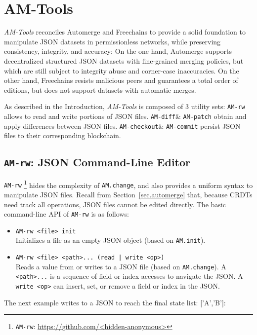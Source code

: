 \documentclass[12pt]{article}
\newcommand{\AMT}      {\emph{AM-Tools}\xspace}
\newcommand{\code}[1]  {\texttt{\footnotesize{#1}}}
\newcommand{\amrw}       {\code{AM-rw}\xspace}
\newcommand{\amdiff}     {\code{AM-diff}\xspace}
\newcommand{\ampatch}    {\code{AM-patch}\xspace}
\newcommand{\amcheckout} {\code{AM-checkout}\xspace}
\newcommand{\amcommit}   {\code{AM-commit}\xspace}
\begin{document}
\section{AM-Tools}
\label{sec.amtools}

\AMT reconciles Automerge and Freechains to provide a solid foundation to
manipulate JSON datasets in permissionless networks, while preserving
consistency, integrity, and accuracy:
%
On the one hand, Automerge supports decentralized structured JSON datasets with
fine-grained merging policies, but which are still subject to integrity abuse
and corner-case inaccuracies.
%
On the other hand, Freechains resists malicious peers and guarantees a total
order of editions, but does not support datasets with automatic merges.

As described in the Introduction, \AMT is composed of 3 utility sets:
\amrw allows to read and write portions of JSON files.
\amdiff \& \ampatch obtain and apply differences between JSON files.
\amcheckout \& \amcommit persist JSON files to their corresponding blockchain.

\subsection{\amrw: JSON Command-Line Editor}

\amrw%
    \footnote{\amrw: \url{https://github.com/<hidden-anonymous>}}
hides the complexity of \code{AM.change}, and also provides a uniform syntax to
manipulate JSON files.
Recall from Section~\ref{sec.automerge} that, because CRDTs need track all
operations, JSON files cannot be edited directly.
%
The basic command-line API of \amrw is as follows:

\begin{itemize}
\item \code{AM-rw <file> init} \\
    Initializes a file as an empty JSON object (based on \code{AM.init}).
\item \code{AM-rw <file> <path>... (read | write <op>)} \\
    Reads a value from or writes to a JSON file (based on \code{AM.change}).
    A \code{<path>...} is a sequence of field or index accesses to navigate the
    JSON.
    A \code{write <op>} can insert, set, or remove a field or index in the
    JSON.
\end{itemize}

The next example writes to a JSON to reach the final state {list: ['A','B']}:
\end{document}

